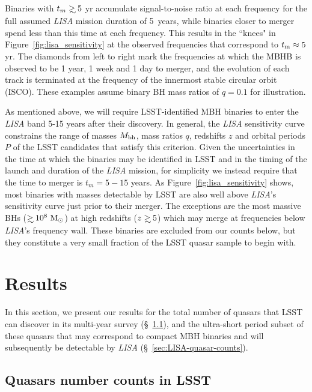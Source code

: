 \documentclass[fleqn,usenatbib]{mnras}
\newcommand\gsim{\mathrel{\rlap{\lower4pt\hbox{\hskip1pt$\sim$}}
        \raise1pt\hbox{$>$}}}
\begin{document}
Binaries with $t_m\gsim 5$ yr accumulate signal-to-noise ratio at each frequency for 
the full assumed {\it LISA} mission duration of 5~years, while binaries closer to merger spend less than this time at each frequency. This results in the ``knees" in Figure~\ref{fig:lisa_sensitivity} at the observed frequencies that correspond to $t_{\rm m}\approx 5$ yr. 
The diamonds from left to right mark the  frequencies at which the MBHB is observed to be 1 year, 1 week and 1 day to merger, and the evolution of each track is terminated at the frequency of the innermost stable circular orbit (ISCO). These examples assume binary BH mass ratios of $q=0.1$ for illustration.

As mentioned above, we will require LSST-identified MBH binaries to enter the {\it LISA} band 5-15 years after their discovery.  In general, the {\it LISA} sensitivity curve constrains the range of masses $M_{\rm bh}$, mass ratios $q$, redshifts $z$ and orbital periods $P$ of the LSST candidates that satisfy this criterion.  Given the uncertainties in the time at which the binaries may be identified in LSST and in the timing of the launch and duration of the {\it LISA} mission, for simplicity we instead require that the time to merger is $t_m=5-15$ years.  
As Figure~\ref{fig:lisa_sensitivity} shows, most binaries with masses detectable by LSST are also well above {\it LISA}'s sensitivity curve just prior to their merger. The exceptions are the most massive BHs ($\gsim 10^8~{\rm M_\odot}$) at high redshifts ($z\gsim 5$) which may merge at frequencies below {\it LISA}'s frequency wall.  These binaries are excluded from our counts below, but they constitute a very small fraction of the LSST quasar sample to begin with.

\section{Results} \label{sec:results}
%
In this section, we present our results for the total number of quasars that LSST can discover in its multi-year survey (\S~\ref{sec:LSST-quasar-counts}), and the ultra-short period subset of these quasars that may correspond to compact MBH binaries and will subsequently be detectable by {\it LISA} (\S~\ref{sec:LISA-quasar-counts}).

\subsection{Quasars number counts in LSST}
\label{sec:LSST-quasar-counts}
\end{document}
